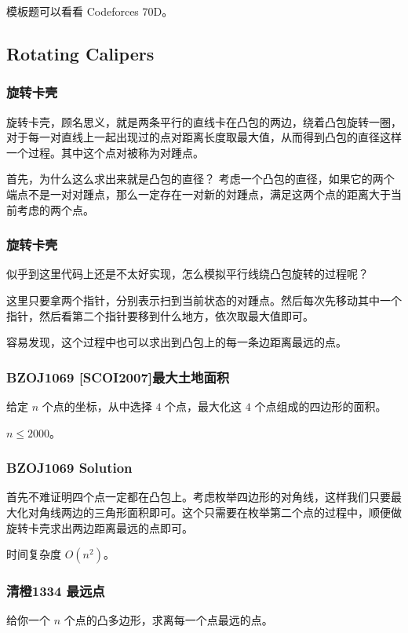 \documentclass[10pt]{beamer}
\begin{document}
\begin{CJK}{UTF8}{gkai}
\begin{spacing}{1.2}
\begin{frame}
			模板题可以看看 Codeforces 70D。

		\end{frame}
		\subsection{Rotating Calipers}
		\begin{frame}
			\frametitle{旋转卡壳}

			旋转卡壳，顾名思义，就是两条平行的直线卡在凸包的两边，绕着凸包旋转一圈，对于每一对直线上一起出现过的点对距离长度取最大值，从而得到凸包的直径这样一个过程。其中这个点对被称为对踵点。 \pause

			首先，为什么这么求出来就是凸包的直径？ \pause 考虑一个凸包的直径，如果它的两个端点不是一对对踵点，那么一定存在一对新的対踵点，满足这两个点的距离大于当前考虑的两个点。

		\end{frame}
		\begin{frame}
			\frametitle{旋转卡壳}

			似乎到这里代码上还是不太好实现，怎么模拟平行线绕凸包旋转的过程呢？ \pause

			这里只要拿两个指针，分别表示扫到当前状态的对踵点。然后每次先移动其中一个指针，然后看第二个指针要移到什么地方，依次取最大值即可。 \pause

			容易发现，这个过程中也可以求出到凸包上的每一条边距离最远的点。

		\end{frame}
		\begin{frame}
			\frametitle{BZOJ1069 [SCOI2007]最大土地面积}

			给定 $n$ 个点的坐标，从中选择 $4$ 个点，最大化这 $4$ 个点组成的四边形的面积。 \pause

			$n \le 2000$。

		\end{frame}
		\begin{frame}
			\frametitle{BZOJ1069 Solution}

			首先不难证明四个点一定都在凸包上。考虑枚举四边形的对角线，这样我们只要最大化对角线两边的三角形面积即可。这个只需要在枚举第二个点的过程中，顺便做旋转卡壳求出两边距离最远的点即可。 \pause

			时间复杂度 $O(n^2)$。

		\end{frame}
		\begin{frame}
			\frametitle{清橙1334 最远点}

			给你一个 $n$ 个点的凸多边形，求离每一个点最远的点。


\end{frame}
\end{spacing}
\end{CJK}
\end{document}
